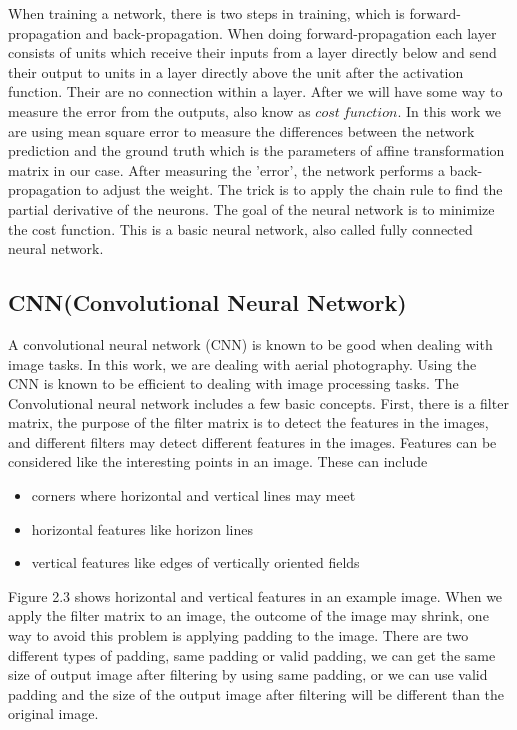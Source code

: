 When training a network, there is two steps in training, which is forward-propagation and back-propagation. When doing forward-propagation each layer consists of units which receive their inputs from a layer directly below and send their output to units in a layer directly above the unit after the activation function. Their are no connection within a layer. After we will have some way to measure the error from the outputs, also know as $ cost\ function$. In this work we are using mean square error to measure the differences between the network prediction and the ground truth which is the parameters of affine transformation matrix in our case. After measuring the 'error', the network performs a back-propagation to adjust the weight. The trick is to apply the chain rule to find the partial derivative of the neurons. The goal of the neural network is to minimize the cost function. This is a basic neural network, also called fully connected neural network\cite{krose1993introduction}. 

\subsection{CNN(Convolutional Neural Network)}
  A convolutional neural network (CNN) is known to be good when dealing with image tasks. In this work, we are dealing with aerial photography. Using the CNN\cite{lecun1989backpropagation} is known to be efficient to dealing with image processing tasks\cite{goodfellow2016deep}. The Convolutional neural network includes a few basic concepts. First, there is a filter matrix, the purpose of the filter matrix is to detect the features in the images, and different filters may detect different features in the images.
Features can be considered like the interesting points in an image. These can include 
\begin{itemize}
\item corners where horizontal and vertical lines may meet
\item horizontal features like horizon lines
\item vertical features like edges of vertically oriented fields
\end{itemize}
Figure 2.3 shows horizontal and vertical features in an example image. When we apply the filter matrix to an image, the outcome of the image may shrink, one way to avoid this problem is applying padding to the image. There are two different types of padding, same padding or valid  padding, we can get the same size of output image after filtering by using same padding, or we can use valid padding and the size of the output image after filtering will be different than the original image. 
 
